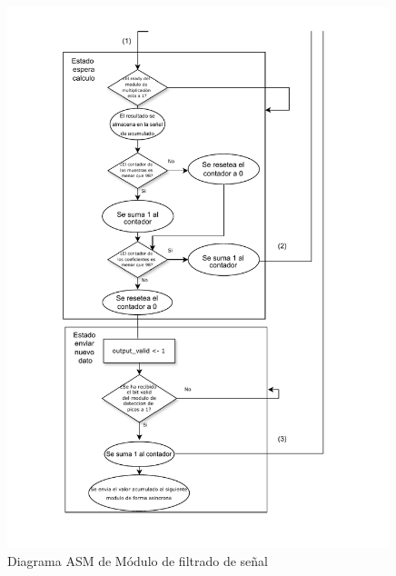 \begin{figure}[h!]
    \centering
    \includegraphics[width=0.99\textwidth]{./Images/img_implementacion_hw/Diagramaasmfiltrado2.pdf}
    \caption{Diagrama ASM de Módulo de filtrado de señal}
    \label{fig:Diagramaasmfiltrado2}
\end{figure} 

